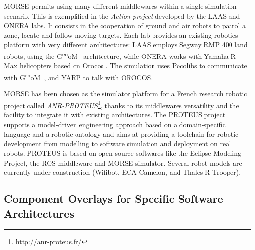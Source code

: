 \documentclass{llncs}
\def\genom{G\textsuperscript{en}oM~}
\newcommand{\serge}[1]{\nb{Serge}{blue}{#1}}
\begin{document}
MORSE permits using many different middlewares within a single simulation
scenario. This is exemplified in the \emph{Action project} \cite{6106782}
developed by the LAAS and ONERA labs.
It consists in the cooperation of ground and air robots to patrol a zone,
locate and follow moving targets.
Each lab provides an existing robotics platform with very different
architectures: LAAS employs Segway RMP 400 land robots, using the \genom
\cite{MALLET-2011-599677} architecture, while ONERA works with Yamaha R-Max
helicopters based on Orocos \cite{orocos2003}. The simulation uses Pocolibs to
communicate with \genom, and YARP to talk with OROCOS.

MORSE has been chosen as the simulator platform for a French research
robotic project called
\emph{ANR-PROTEUS}\footnote{\url{http://anr-proteus.fr/}}, thanks to
its middlewares versatility and the facility to integrate it with
existing architectures.
The PROTEUS project supports a model-driven engineering approach based on a
domain-specific language and a robotic ontology\cite{Dhouib:2011zr} and aims at
providing a toolchain for robotic development from modelling to software
simulation and deployment on real robots. PROTEUS is based on open-source
softwares like the Eclipse Modeling Project, the ROS middleware and MORSE
simulator. Several robot models are currently under construction (Wifibot,
ECA Camelon, and Thales R-Trooper).


\subsection{Component Overlays for Specific Software Architectures}
\label{section:overlays}

\end{document}
